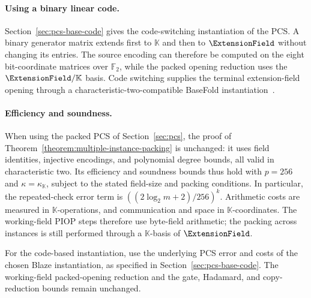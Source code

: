 \paragraph{Using a binary linear code.}
Section~\ref{sec:pcs-base-code} gives the code-switching
instantiation of the PCS. A binary generator matrix extends
first to \(\mathbb K\) and then to \(\ExtensionField\) without
changing its entries. The source encoding can therefore be
computed on the eight bit-coordinate matrices over \(\mathbb F_2\),
while the packed opening reduction uses the
\(\ExtensionField/\mathbb K\) basis.
Code switching supplies the terminal extension-field opening
through a characteristic-two-compatible BaseFold
instantiation~\cite{eurocrypt/DiamondP26}.

\paragraph{Efficiency and soundness.}
When using the packed PCS of Section~\ref{sec:pcs}, the proof of
Theorem~\ref{theorem:multiple-instance-packing} is unchanged:
it uses field identities, injective encodings, and polynomial
degree bounds, all valid in characteristic two.
Its efficiency and soundness bounds thus hold with
\(p=256\) and \(\kappa=\kappa_{\mathbb K}\), subject to the
stated field-size and packing conditions.
In particular, the repeated-check error term is
\(((2\log_2m+2)/256)^k\).
Arithmetic costs are measured in \(\mathbb K\)-operations,
and communication and space in \(\mathbb K\)-coordinates.
The working-field PIOP steps therefore use byte-field arithmetic;
the packing across instances is still performed through a
\(\mathbb K\)-basis of \(\ExtensionField\).

For the code-based instantiation, use
the underlying PCS error and costs of the chosen Blaze
instantiation, as specified in Section~\ref{sec:pcs-base-code}.
The working-field packed-opening reduction and the gate,
Hadamard, and copy-reduction bounds remain unchanged.
